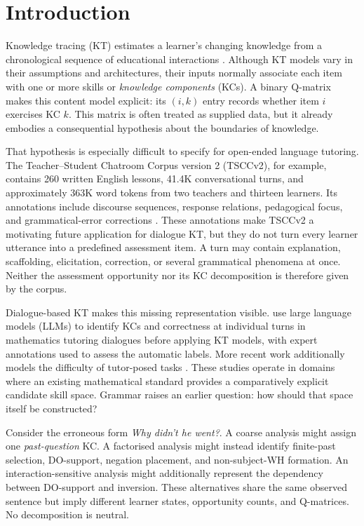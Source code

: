 \section{Introduction}

Knowledge tracing (KT) estimates a learner's changing knowledge from a
chronological sequence of educational interactions
\citep{corbett-anderson-1995,abdelrahman-etal-2023}.  Although KT models vary in
their assumptions and architectures, their inputs normally associate each item
with one or more skills or \emph{knowledge components} (KCs).  A binary
Q-matrix makes this content model explicit: its $(i,k)$ entry records whether
item $i$ exercises KC $k$.  This matrix is often treated as supplied data, but
it already embodies a consequential hypothesis about the boundaries of
knowledge.

That hypothesis is especially difficult to specify for open-ended language
tutoring.  The Teacher--Student Chatroom Corpus version 2 (TSCCv2), for
example, contains 260 written English lessons, 41.4K conversational turns, and
approximately 363K word tokens from two teachers and thirteen learners.  Its
annotations include discourse sequences, response relations, pedagogical
focus, and grammatical-error corrections \citep{caines-etal-2022-teacher}.
These annotations make TSCCv2 a motivating future application for dialogue KT,
but they do not turn every learner utterance into a predefined assessment item.
A turn may contain explanation, scaffolding, elicitation, correction, or
several grammatical phenomena at once.  Neither the assessment opportunity nor
its KC decomposition is therefore given by the corpus.

Dialogue-based KT makes this missing representation visible.  \citet{scarlatos-etal-2025-dialogue}
use large language models (LLMs) to identify KCs and correctness at individual
turns in mathematics tutoring dialogues before applying KT models, with expert
annotations used to assess the automatic labels.  More recent work additionally
models the difficulty of tutor-posed tasks \citep{huang-etal-2026-interpretable}.
These studies operate in domains where an existing mathematical standard
provides a comparatively explicit candidate skill space.  Grammar raises an
earlier question: how should that space itself be constructed?

Consider the erroneous form \emph{Why didn't he went?}.  A coarse analysis
might assign one \emph{past-question} KC.  A factorised analysis might instead
identify finite-past selection, DO-support, negation placement, and
non-subject-WH formation.  An interaction-sensitive analysis might additionally
represent the dependency between DO-support and inversion.  These alternatives
share the same observed sentence but imply different learner states,
opportunity counts, and Q-matrices.  No decomposition is neutral.

